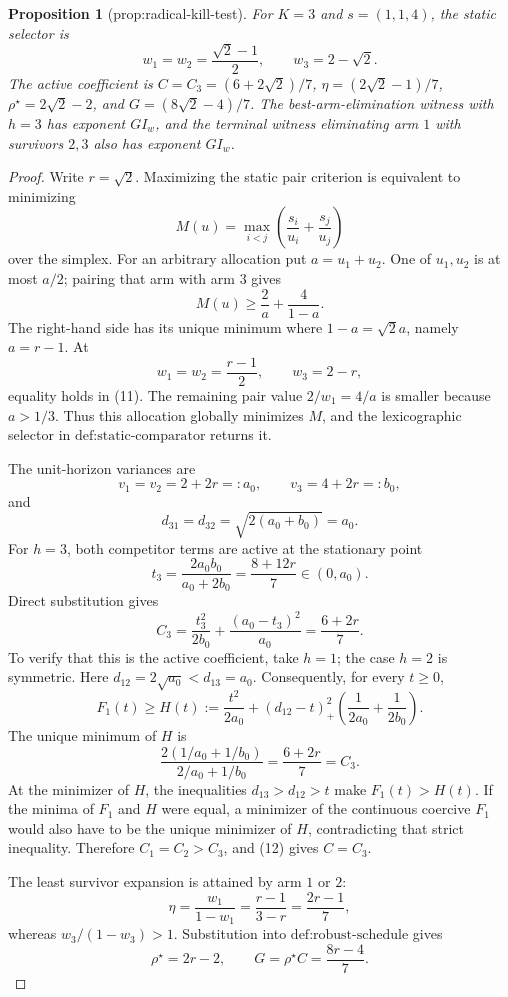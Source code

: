 \documentclass{article}
\newtheorem{proposition}{Proposition}
\begin{document}
\begin{proposition}[prop:radical-kill-test]\label{prop:radical-kill-test}
For \(K=3\) and \(s=(1,1,4)\), the static selector is \[w_1=w_2=\frac{\sqrt2-1}{2},\qquad w_3=2-\sqrt2.\] The active coefficient is \(C=C_3=(6+2\sqrt2)/7\), \(\eta=(2\sqrt2-1)/7\), \(\rho^\star=2\sqrt2-2\), and \(G=(8\sqrt2-4)/7\). The best-arm-elimination witness with \(h=3\) has exponent \(G I_w\), and the terminal witness eliminating arm \(1\) with survivors \(2,3\) also has exponent \(G I_w\).
\end{proposition}
\begin{proof}
Write \(r=\sqrt2\). Maximizing the static pair criterion is equivalent to minimizing
\[
 M(u)=\max_{i<j}\left(\frac{s_i}{u_i}+\frac{s_j}{u_j}\right)
\]
over the simplex. For an arbitrary allocation put \(a=u_1+u_2\). One of \(u_1,u_2\) is at most \(a/2\); pairing that arm with arm \(3\) gives
\[
 M(u)\geq \frac2a+\frac4{1-a}. \tag{11}
\]
The right-hand side has its unique minimum where \(1-a=\sqrt2a\), namely \(a=r-1\). At
\[
 w_1=w_2=\frac{r-1}{2},\qquad w_3=2-r,
\]
equality holds in (11). The remaining pair value \(2/w_1=4/a\) is smaller because \(a>1/3\). Thus this allocation globally minimizes \(M\), and the lexicographic selector in \(\text{def:static-comparator}\) returns it.

The unit-horizon variances are
\[
 v_1=v_2=2+2r=:a_0,\qquad v_3=4+2r=:b_0,
\]
and
\[
 d_{31}=d_{32}=\sqrt{2(a_0+b_0)}=a_0.
\]
For \(h=3\), both competitor terms are active at the stationary point
\[
 t_3=\frac{2a_0b_0}{a_0+2b_0}=\frac{8+12r}{7}\in(0,a_0).
\]
Direct substitution gives
\[
 C_3=\frac{t_3^2}{2b_0}+\frac{(a_0-t_3)^2}{a_0}
 =\frac{6+2r}{7}. \tag{12}
\]
To verify that this is the active coefficient, take \(h=1\); the case \(h=2\) is symmetric. Here \(d_{12}=2\sqrt{a_0}<d_{13}=a_0\). Consequently, for every \(t\geq0\),
\[
 F_1(t)\geq H(t):=\frac{t^2}{2a_0}
 +(d_{12}-t)_+^2\left(\frac1{2a_0}+\frac1{2b_0}\right).
\]
The unique minimum of \(H\) is
\[
 \frac{2(1/a_0+1/b_0)}{2/a_0+1/b_0}
 =\frac{6+2r}{7}=C_3.
\]
At the minimizer of \(H\), the inequalities \(d_{13}>d_{12}>t\) make \(F_1(t)>H(t)\). If the minima of \(F_1\) and \(H\) were equal, a minimizer of the continuous coercive \(F_1\) would also have to be the unique minimizer of \(H\), contradicting that strict inequality. Therefore \(C_1=C_2>C_3\), and (12) gives \(C=C_3\).

The least survivor expansion is attained by arm \(1\) or \(2\):
\[
 \eta=\frac{w_1}{1-w_1}
 =\frac{r-1}{3-r}
 =\frac{2r-1}{7},
\]
whereas \(w_3/(1-w_3)>1\). Substitution into \(\text{def:robust-schedule}\) gives
\[
 \rho^\star=2r-2,
 \qquad
 G=\rho^\star C=\frac{8r-4}{7}. \tag{13}
\]


\end{proof}
\end{document}
